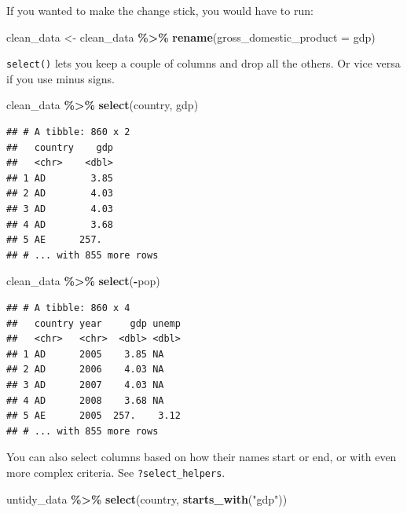 \documentclass[
  12pt,
  oneside,openany]{book}
\newenvironment{Shaded}{\begin{snugshade}}{\end{snugshade}}
\newcommand{\DataTypeTok}[1]{\textcolor[rgb]{0.13,0.29,0.53}{#1}}
\newcommand{\KeywordTok}[1]{\textcolor[rgb]{0.13,0.29,0.53}{\textbf{#1}}}
\newcommand{\NormalTok}[1]{#1}
\newcommand{\OperatorTok}[1]{\textcolor[rgb]{0.81,0.36,0.00}{\textbf{#1}}}
\newcommand{\StringTok}[1]{\textcolor[rgb]{0.31,0.60,0.02}{#1}}
\begin{document}
If you wanted to make the change stick, you would have to run:

\begin{Shaded}
\begin{Highlighting}[]
\NormalTok{clean\_data <{-}}\StringTok{ }\NormalTok{clean\_data }\OperatorTok{\%>\%}
\StringTok{  }\KeywordTok{rename}\NormalTok{(}\DataTypeTok{gross\_domestic\_product =}\NormalTok{ gdp)}
\end{Highlighting}
\end{Shaded}

\texttt{select()} lets you keep a couple of columns and drop all the others. Or vice versa if you use minus signs.

\begin{Shaded}
\begin{Highlighting}[]
\NormalTok{clean\_data }\OperatorTok{\%>\%}
\StringTok{  }\KeywordTok{select}\NormalTok{(country, gdp)}
\end{Highlighting}
\end{Shaded}

\begin{verbatim}
## # A tibble: 860 x 2
##   country    gdp
##   <chr>    <dbl>
## 1 AD        3.85
## 2 AD        4.03
## 3 AD        4.03
## 4 AD        3.68
## 5 AE      257.  
## # ... with 855 more rows
\end{verbatim}

\begin{Shaded}
\begin{Highlighting}[]
\NormalTok{clean\_data }\OperatorTok{\%>\%}
\StringTok{  }\KeywordTok{select}\NormalTok{(}\OperatorTok{{-}}\NormalTok{pop)}
\end{Highlighting}
\end{Shaded}

\begin{verbatim}
## # A tibble: 860 x 4
##   country year     gdp unemp
##   <chr>   <chr>  <dbl> <dbl>
## 1 AD      2005    3.85 NA   
## 2 AD      2006    4.03 NA   
## 3 AD      2007    4.03 NA   
## 4 AD      2008    3.68 NA   
## 5 AE      2005  257.    3.12
## # ... with 855 more rows
\end{verbatim}

You can also select columns based on how their names start or end, or with even more complex criteria.
See \texttt{?select\_helpers}.

\begin{Shaded}
\begin{Highlighting}[]
\NormalTok{untidy\_data }\OperatorTok{\%>\%}
\StringTok{  }\KeywordTok{select}\NormalTok{(country, }\KeywordTok{starts\_with}\NormalTok{(}\StringTok{"gdp"}\NormalTok{))}
\end{Highlighting}
\end{Shaded}
\end{document}
